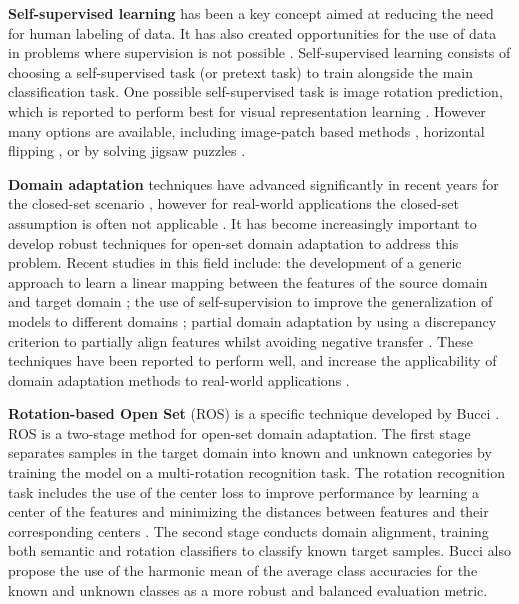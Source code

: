 \documentclass[10pt,twocolumn,letterpaper]{article}
\begin{document}
\textbf{Self-supervised learning} has been a key concept aimed at reducing the need for human labeling of data. It has also created opportunities for the use of data in problems where supervision is not possible \cite{Yaman2020}. Self-supervised learning consists of choosing a self-supervised task (or pretext task) to train alongside the main classification task. One possible self-supervised task is image rotation prediction, which is reported to perform best for visual representation learning \cite{Xu2019, Gidaris2018}. However many options are available, including image-patch based methods \cite{Mundhenk2018, Kim2018}, horizontal flipping \cite{Golan2018}, or by solving jigsaw puzzles \cite{Carlucci2019, Kim2018}. 


\textbf{Domain adaptation} techniques have advanced significantly in recent years for the closed-set scenario \cite{Pau2020}, however for real-world applications the closed-set assumption is often not applicable \cite{Ren2021}. It has become increasingly important to develop robust techniques for open-set domain adaptation to address this problem. Recent studies in this field include: the development of a generic approach to learn a linear mapping between the features of the source domain and target domain \cite{Pau2020}; the use of self-supervision to improve the generalization of models to different domains \cite{Carlucci2019}; partial domain adaptation by using a discrepancy criterion to partially align features whilst avoiding negative transfer \cite{Ren2021}. These techniques have been reported to perform well, and increase the applicability of domain adaptation methods to real-world applications \cite{Carlucci2019, Ren2021,Pau2020}.


\textbf{Rotation-based Open Set} (ROS) is a specific technique developed by Bucci \etal \cite{Bucci2020}. ROS is a two-stage method for open-set domain adaptation. The first stage separates samples in the target domain into known and unknown categories by training the model on a multi-rotation recognition task. The rotation recognition task includes the use of the center loss to improve performance by learning a center of the features and minimizing the distances between features and their corresponding centers \cite{Wen2016}. The second stage conducts domain alignment, training both semantic and rotation classifiers to classify known target samples. Bucci \etal \cite{Bucci2020} also propose the use of the harmonic mean of the average class accuracies  for the known and unknown classes as a more robust and balanced evaluation metric.
\end{document}
